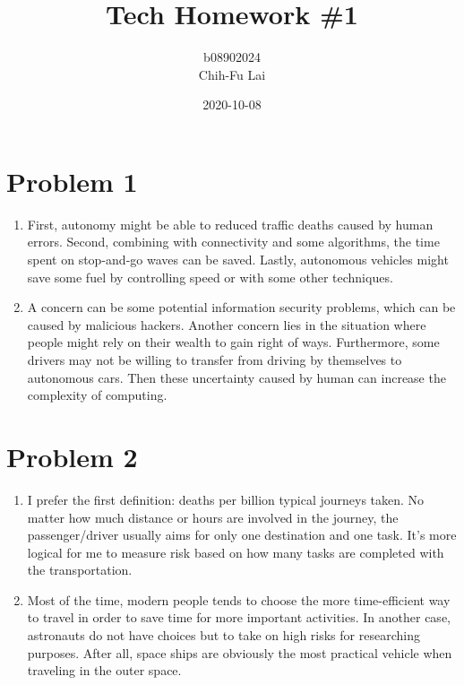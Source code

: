 \documentclass[12pt]{article}
\title{Tech Homework \#1}
\date{2020-10-08}
\author{b08902024\\Chih-Fu Lai}
\begin{document}
\maketitle
\newpage
{}

\section*{Problem 1}
\begin{enumerate}
    \item First, autonomy might be able to reduced traffic deaths caused by human errors.
    Second, combining with connectivity and some algorithms, the time spent on stop-and-go waves can be saved.
    Lastly, autonomous vehicles might save some fuel by controlling speed or with some other techniques.
    \item A concern can be some potential information security problems, which can be caused by malicious hackers.
    Another concern lies in the situation where people might rely on their wealth to gain right of ways.
    Furthermore, some drivers may not be willing to transfer from driving by themselves to autonomous cars.
    Then these uncertainty caused by human can increase the complexity of computing.
\end{enumerate}

\section*{Problem 2}
\begin{enumerate}
    \item I prefer the first definition: deaths per billion typical journeys taken.
    No matter how much distance or hours are involved in the journey, the passenger/driver usually aims for only one destination and one task.
    It's more logical for me to measure risk based on how many tasks are completed with the transportation.
    \item Most of the time, modern people tends to choose the more time-efficient way to travel in order to save time for more important activities.
    In another case, astronauts do not have choices but to take on high risks for researching purposes.
    After all, space ships are obviously the most practical vehicle when traveling in the outer space.
\end{enumerate}
\end{document}
